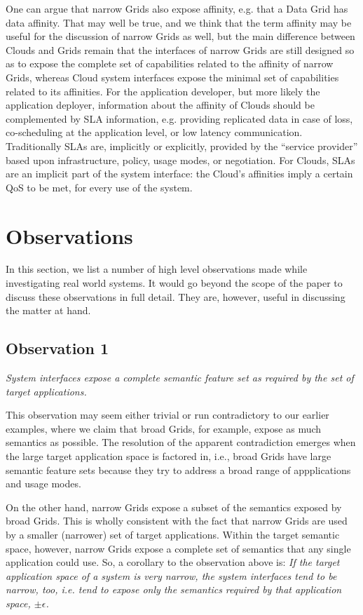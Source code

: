 \documentclass[conference,final]{IEEEtran}
\newcommand{\I}[1]{\textit{#1}}
\newcommand{\B}[1]{\textbf{#1}}
\begin{document}
  One can argue that narrow Grids also expose affinity, e.g. that a
  Data Grid has data affinity.  That may well be true, and we think
  that the term affinity may be useful for the discussion of narrow
  Grids as well, but the main difference between Clouds and Grids
  remain that the interfaces of narrow Grids are still designed so as
  to expose the complete set of capabilities related to the affinity
  of narrow Grids, whereas Cloud system interfaces expose the minimal
  set of capabilities related to its affinities.  For the application
  developer, but more likely the application deployer, information
  about the affinity of Clouds should be complemented by SLA
  information, e.g. providing replicated data in case of loss,
  co-scheduling at the application level, or low latency
  communication.  Traditionally SLAs are, implicitly or explicitly,
  provided by the ``service provider'' based upon infrastructure,
  policy, usage modes, or negotiation.  For Clouds, SLAs are an
  implicit part of the system interface: the Cloud's affinities imply
  a certain QoS to be met, for every use of the system.


\section{Observations}

 In this section, we list a number of high level observations made
 while investigating real world systems.  It would go beyond the scope
 of the paper to discuss these observations in full detail.  They are,
 however, useful in discussing the matter at hand.

 \subsection*{\B{Observation 1}} 
 
  \I{System interfaces expose a complete semantic feature set as
  required by the set of target applications.}

  This observation may seem either trivial or run contradictory to our
  earlier examples, where we claim that broad Grids, for example,
  expose as much semantics as possible.  The resolution of the
  apparent contradiction emerges when the large target application
  space is factored in, i.e., broad Grids have large semantic feature
  sets because they try to address a broad range of appplications and
  usage modes.

  On the other hand, narrow Grids expose a subset of the semantics
  exposed by broad Grids. This is wholly consistent with the fact that
  narrow Grids are used by a smaller (narrower) set of target
  applications.  Within the target semantic space, however, narrow
  Grids expose a complete set of semantics that any single application
  could use.  So, a corollary to the observation above is: \I{If the
  target application space of a system is very narrow, the system
  interfaces tend to be narrow, too, i.e. tend to expose only the
  semantics required by that application space, $\pm\epsilon$.}
\end{document}
